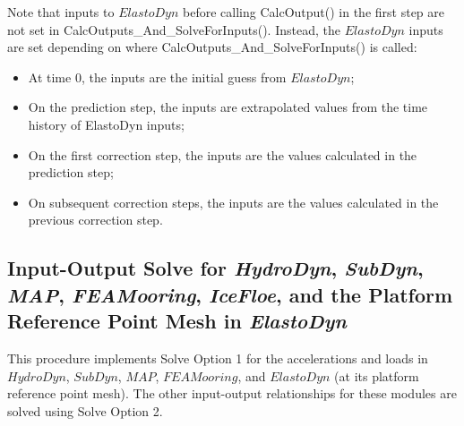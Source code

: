 \documentclass[10pt,letterpaper,oneside,notitlepage]{article}
\begin{document}
Note that inputs to $ElastoDyn$ before calling CalcOutput() in the first step are not set in CalcOutputs\_And\_SolveForInputs(). 
Instead, the $ElastoDyn$ inputs are set depending on where CalcOutputs\_And\_SolveForInputs() is called:
\begin{itemize}[noitemsep] %
	\item At time 0, the inputs are the initial guess from $ElastoDyn$;
	\item On the prediction step, the inputs are extrapolated values from the time history of ElastoDyn inputs;
	\item On the first correction step, the inputs are the values calculated in the prediction step;
	\item On subsequent correction steps, the inputs are the values calculated in the previous correction step.
\end{itemize}


\subsection {Input-Output Solve for \textit{HydroDyn}, \textit{SubDyn}, \textit{MAP}, 
       \textit{FEAMooring}, \textit{IceFloe}, and the Platform Reference Point Mesh in \textit{ElastoDyn}}

This procedure implements Solve Option 1 for the accelerations and loads in
$HydroDyn$, $SubDyn$, $MAP$, $FEAMooring$, and $ElastoDyn$ (at its platform reference point mesh). 
The other input-output relationships for these modules are solved using Solve Option 2.
\end{document}
